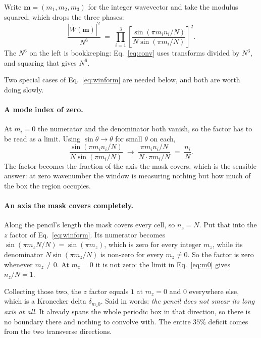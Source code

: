 \documentclass[12pt]{article}
\begin{document}
Write $\mathbf{m} = (m_1, m_2, m_3)$ for the integer wavevector and take the
modulus squared, which drops the three phases:
\begin{equation}
  \label{eq:winform}
  \frac{|\widetilde W(\mathbf{m})|^2}{N^6} \;=\;
  \prod_{i=1}^{3}
  \left[ \frac{\sin(\pi m_i n_i / N)}{N \sin(\pi m_i / N)} \right]^2 .
\end{equation}
The $N^6$ on the left is bookkeeping: Eq.~\eqref{eq:conv} uses transforms
divided by $N^3$, and squaring that gives $N^6$.

Two special cases of Eq.~\eqref{eq:winform} are needed below, and both are worth
doing slowly.

\paragraph{A mode index of zero.}
At $m_i = 0$ the numerator and the denominator both vanish, so the factor has to
be read as a limit. Using $\sin\theta \to \theta$ for small $\theta$ on each,
\begin{equation}
  \label{eq:m0}
  \frac{\sin(\pi m_i n_i / N)}{N \sin(\pi m_i / N)}
  \;\longrightarrow\;
  \frac{\pi m_i n_i / N}{N \cdot \pi m_i / N} \;=\; \frac{n_i}{N} .
\end{equation}
The factor becomes the fraction of the axis the mask covers, which is the
sensible answer: at zero wavenumber the window is measuring nothing but how much
of the box the region occupies.

\paragraph{An axis the mask covers completely.}
Along the pencil's length the mask covers every cell, so $n_z = N$. Put that
into the $z$ factor of Eq.~\eqref{eq:winform}. Its numerator becomes
$\sin(\pi m_z N/N) = \sin(\pi m_z)$, which is zero for every integer $m_z$,
while its denominator $N\sin(\pi m_z/N)$ is non-zero for every $m_z \neq 0$. So
the factor is zero whenever $m_z \neq 0$. At $m_z = 0$ it is not zero: the limit
in Eq.~\eqref{eq:m0} gives $n_z/N = 1$.

Collecting those two, the $z$ factor equals $1$ at $m_z = 0$ and $0$ everywhere
else, which is a Kronecker delta $\delta_{m_z 0}$. Said in words: \emph{the
pencil does not smear its long axis at all}. It already spans the whole periodic
box in that direction, so there is no boundary there and nothing to convolve
with. The entire $35\%$ deficit comes from the two transverse directions.
\end{document}
